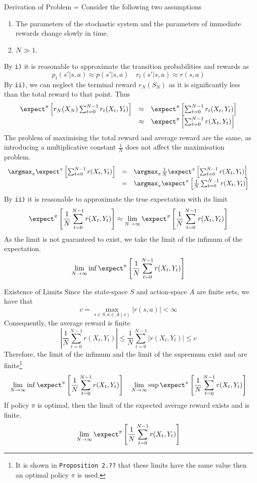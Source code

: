 \documentclass[11pt,a4paper]{article}
\begin{document}
  \begin{proposition}{Derivation of Problem}
    \everymath={\displaystyle}
    Consider the following two assumptions
    \begin{enumerate}
      \item The parameters of the stochastic system and the parameters of immediate rewards change slowly in time.
      \item $N\gg1$.
    \end{enumerate}
    By \texttt{i)} it is reasonable to approximate the transition probabilities and rewards as
    \[ p_t(s'|s,a)\approx p(s'|s,a)\quad r_t(s'|s,a)\approx r(s,a) \]
    By \texttt{ii)}, we can neglect the terminal reward $r_N(S_N)$ as it is significantly less than the total reward to that point. Thus
    \[\begin{array}{rcl}
      \expect^\pi\left[r_N(X_N)\sum_{t=0}^{N-1}r_t(X_t,Y_t)\right]&\approx&\expect^\pi\left[\sum_{t=0}^{N-1}r_t(X_t,Y_t)\right]\\
      &\approx&\expect^\pi\left[\sum_{t=0}^{N-1}r(X_t,Y_t)\right]
    \end{array}\]
    The problem of maximising the total reward and average reward are the same, as introducing a multiplicative constant $\frac1N$ does not affect the maximisation problem.
    \[\begin{array}{rcl}
      \argmax_\pi\expect^\pi\left[\sum_{t=0}^{N-1}r(X_t,Y_t)\right]&=&\argmax_\pi\frac1N\expect^\pi\left[\sum_{t=0}^{N-1}r(X_t,Y_t)\right]\\
      &=&\argmax_\pi\expect^\pi\left[\frac1N\sum_{t=0}^{N-1}r(X_t,Y_t)\right]
    \end{array}\]
    By \texttt{ii)}  it is reasonable to approximate the true expectation with its limit
    \[ \expect^\pi\left[\frac1N\sum_{t=0}^{N-1}r(X_t,Y_t)\right]\approx\lim_{N\to\infty}\expect^\pi\left[\frac1N\sum_{t=0}^{N-1}r(X_t,Y_t)\right] \]
    As the limit is not guaranteed to exist, we take the limit of the infimum of the expectation.
    \[ \lim_{N\to\infty}\inf\expect^\pi\left[\frac1N\sum_{t=0}^{N-1}r(X_t,Y_t)\right] \]
  \end{proposition}

  \begin{proposition}{Existence of Limits}
    Since the state-space $S$ and action-space $A$ are finite sets, we have that
    \[ c=\max_{s\in S,a\in A(s)}|r(s,a)|<\infty \]
    Consequently, the average reward is finite
    \[ \left|\frac1N\sum_{t=0}^{N-1}r(X_t,Y_t)\right|\leq\frac1N\sum_{t=0}^{N-1}|r(X_t,Y_t)|\leq c \]
    Therefore, the limit of the infimum and the limit of the supremum exist and are finite\footnote{It is shown in \texttt{Proposition 2.??} that these limits have the same value then an optimal policy $\pi$ is used. }
    \[ \lim_{N\to\infty}\inf\expect^\pi\left[\frac1N\sum_{t=0}^{N-1}r(X_t,Y_t)\right] \quad \lim_{N\to\infty}\sup\expect^\pi\left[\frac1N\sum_{t=0}^{N-1}r(X_t,Y_t)\right] \]
    If policy $\pi$ is optimal, then the limit of the expected average reward exists and is finite.
    \[ \lim_{N\to\infty}\expect^\pi\left[\frac1N\sum_{t=0}^{N-1}r(X_t,Y_t)\right] \]
  \end{proposition}
\end{document}
